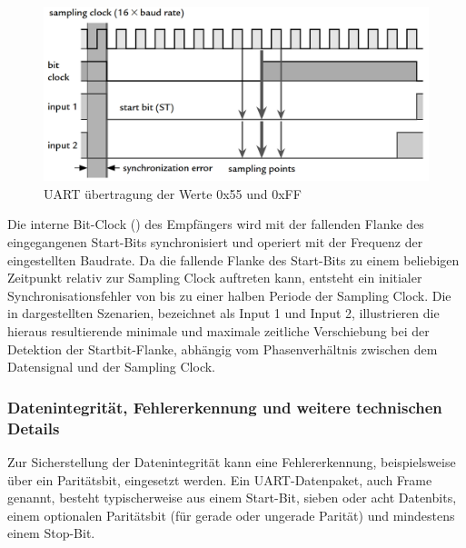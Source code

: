 \begin{figure}[h!]
	\centering
	\includegraphics[width=1.0\textwidth]{../Bilder/uart_protocoll.png}
	\caption{UART \"ubertragung der Werte 0x55 und 0xFF\\}
	\label{fig:uart_uebertragung}
\end{figure}

Die interne Bit-Clock () des Empf\"angers wird mit der fallenden Flanke des eingegangenen Start-Bits synchronisiert und operiert mit der Frequenz der eingestellten Baudrate. Da die fallende Flanke des Start-Bits zu einem beliebigen Zeitpunkt relativ zur Sampling Clock auftreten kann, entsteht ein initialer Synchronisationsfehler von bis zu einer halben Periode der Sampling Clock. Die in  dargestellten Szenarien, bezeichnet als \glqq Input 1\grqq{} und \glqq Input 2\grqq{}, illustrieren die hieraus resultierende minimale und maximale zeitliche Verschiebung bei der Detektion der Startbit-Flanke, abh\"angig vom Phasenverh\"altnis zwischen dem Datensignal und der Sampling Clock. \\

\newpage
\subsubsection{Datenintegrit\"at, Fehlererkennung und weitere technischen Details}
\label{sec:datenintegritaet}

Zur Sicherstellung der Datenintegrit\"at kann eine Fehlererkennung, beispielsweise \"uber ein Parit\"atsbit, eingesetzt werden. Ein UART-Datenpaket, auch Frame genannt, besteht typischerweise aus einem Start-Bit, sieben oder acht Datenbits, einem optionalen Parit\"atsbit (f\"ur gerade oder ungerade Parit\"at) und mindestens einem Stop-Bit.

